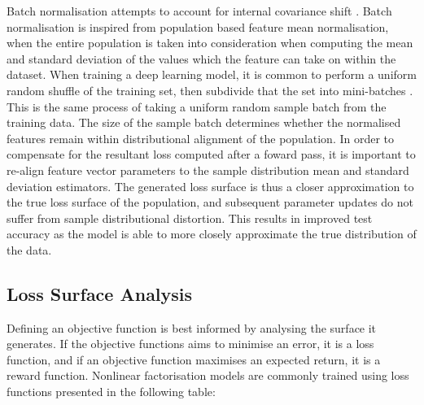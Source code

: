 Batch normalisation attempts to account for internal covariance shift \cite{reference}. Batch normalisation is inspired from population based feature mean normalisation, when the entire population is taken into consideration when computing the mean and standard deviation of the values which the feature can take on within the dataset. When training a deep learning model, it is common to perform a uniform random shuffle of the training set, then subdivide that the set into mini-batches \cite{reference}. This is the same process of taking a uniform random sample batch from the training data. The size of the sample batch determines whether the normalised features remain within distributional alignment of the population. In order to compensate for the resultant loss computed after a foward pass, it is important to re-align feature vector parameters to the sample distribution mean and standard deviation estimators. The generated loss surface is thus a closer approximation to the true loss surface of the population, and subsequent parameter updates do not suffer from sample distributional distortion. This results in improved test accuracy as the model is able to more closely approximate the true distribution of the data. \newline 

\subsection{Loss Surface Analysis}
Defining an objective function is best informed by analysing the surface it generates. If the objective functions aims to minimise an error, it is a loss function, and if an objective function maximises an expected return, it is a reward function. Nonlinear factorisation models are commonly trained using loss functions presented in the following table:

